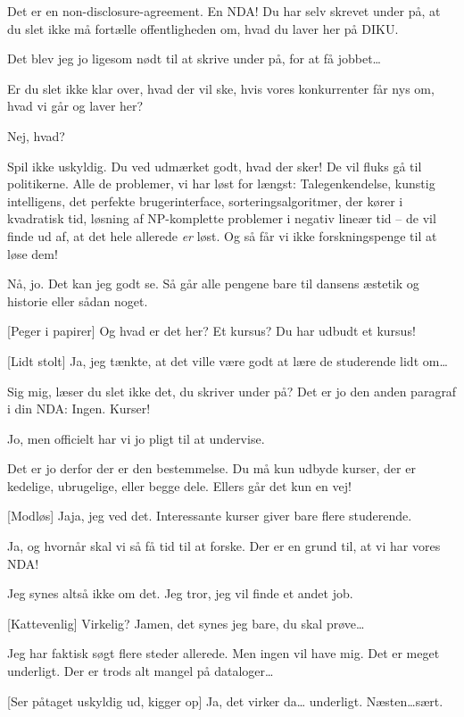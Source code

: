 \documentclass[a4paper,11pt]{article}
\begin{document}
\begin{sketch}
 Det er en non-disclosure-agreement. En NDA! Du har selv skrevet
under på, at du slet ikke må fortælle offentligheden om, hvad du laver her på
DIKU.

 Det blev jeg jo ligesom nødt til at skrive under på, for at få
jobbet\ldots

 Er du slet ikke klar over, hvad der vil ske, hvis vores konkurrenter
får nys om, hvad vi går og laver her?

 Nej, hvad?

 Spil ikke uskyldig. Du ved udmærket godt, hvad der sker! De vil
fluks gå til politikerne. Alle de problemer, vi har løst for længst:
Talegenkendelse, kunstig intelligens,
det perfekte brugerinterface, sorteringsalgoritmer, der kører i kvadratisk
tid, løsning af NP-komplette problemer i negativ lineær tid -- de vil finde ud
af, at det hele allerede \emph{er} løst. Og så får vi ikke forskningspenge til
at løse dem!

 Nå, jo. Det kan jeg godt se. Så går alle pengene bare til dansens
æstetik og historie eller sådan noget.

[Peger i papirer] Og hvad er det her? Et kursus? Du har udbudt et
kursus!

[Lidt stolt] Ja, jeg tænkte, at det ville være godt at lære de
studerende lidt om\ldots

 Sig mig, læser du slet ikke det, du skriver under på? Det er jo den
anden paragraf i din NDA: Ingen. Kurser!

 Jo, men officielt har vi jo pligt til at undervise.

 Det er jo derfor der er den bestemmelse. Du må kun udbyde kurser,
der er kedelige, ubrugelige, eller begge dele. Ellers går det kun en vej!

[Modløs] Jaja, jeg ved det. Interessante kurser giver bare flere
studerende.

 Ja, og hvornår skal vi så få tid til at forske. Der er en grund til,
at vi har vores NDA!

 Jeg synes altså ikke om det. Jeg tror, jeg vil finde et andet job.

[Kattevenlig] Virkelig? Jamen, det synes jeg bare, du skal
prøve\ldots

 Jeg har faktisk søgt flere steder allerede. Men ingen vil have
mig. Det er meget underligt. Der er trods alt mangel på dataloger\ldots

[Ser påtaget uskyldig ud, kigger op] Ja, det virker da\ldots 
underligt. Næsten\ldots  sært.


\end{sketch}
\end{document}
